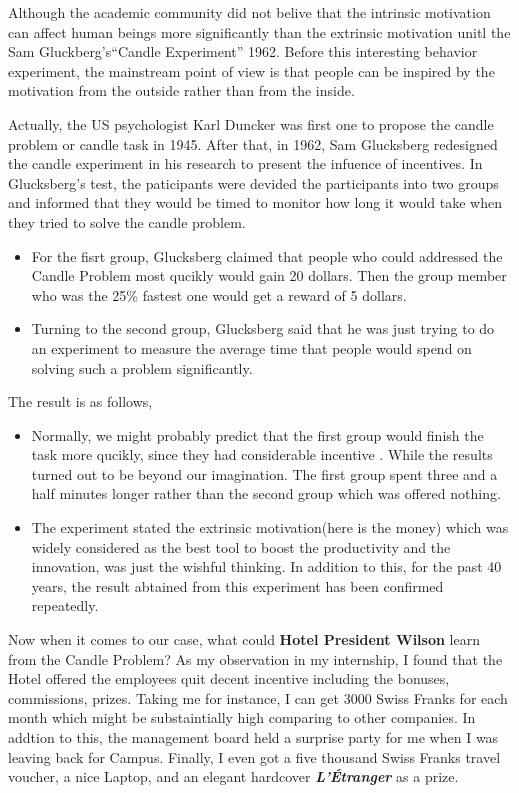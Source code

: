 \documentclass[12pt,onecolumn,a4paper]{IEEEtran}
\begin{document}
Although the academic community did not belive that the intrinsic motivation can affect human beings more significantly than the extrinsic motivation unitl the Sam Gluckberg's``Candle Experiment'' 1962\cite{glucksberg}. Before this interesting behavior experiment, the mainstream point of view is that people can be inspired by the motivation from the outside rather than from the inside. 

Actually, the US psychologist Karl Duncker was first one to propose the candle problem or candle task in 1945. After that, in 1962, Sam Glucksberg\cite{glucksberg} redesigned the candle experiment in his research to present the infuence of incentives. In Glucksberg's test, the paticipants were devided the participants into two groups and informed that they would be timed to monitor how long it would take when they tried to solve the candle problem.

\begin{itemize}
  \item For the fisrt group, Glucksberg claimed that people who could addressed the Candle Problem most qucikly would gain 20 dollars. Then the group member who was the 25\% fastest one would get a reward of 5 dollars.
  \item Turning to the second group, Glucksberg said that he was just trying to do an experiment to measure the average time that people would spend on solving such a problem significantly.
\end{itemize}

The result is as follows,
\begin{itemize}
  \item Normally, we might probably predict that the first group would finish the task more qucikly, since they had considerable incentive . While the results turned out to be beyond our imagination. The first group spent three and a half minutes longer rather than the second group which was offered nothing. 
  
  \item The experiment stated the extrinsic motivation(here is the money) which was widely considered as the best tool to boost the productivity and the innovation, was just the wishful thinking. In addition to this, for the past 40 years, the result abtained from this experiment has been confirmed repeatedly.
\end{itemize}

\newpage
Now when it comes to our case, what could \textbf{Hotel President Wilson} learn from the Candle Problem? As my observation in my internship, I found that the Hotel offered the employees quit decent incentive including the bonuses, commissions, prizes. Taking me for instance, I can get 3000 Swiss Franks for each month which might be substaintially high comparing to other companies. In addtion to this, the management board held a surprise party for me when I was leaving back for Campus. Finally, I even got a five thousand Swiss Franks travel voucher, a nice Laptop, and an elegant hardcover \textit{\textbf{L'Étranger}} as a prize. 
\end{document}
